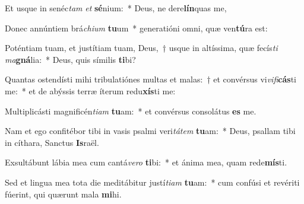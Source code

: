 \item Et usque in senéc\textit{tam} \textit{et} \textbf{sé}nium:~* Deus, ne dere\textbf{lín}quas me,
\item Donec annúntiem brá\textit{chi}\textit{um} \textbf{tu}um~* generatióni omni, quæ ven\textbf{tú}ra est:
\item Poténtiam tuam, et justítiam tuam, Deus,~† usque in altíssima, quæ fecís\textit{ti} \textit{ma}\textbf{gná}lia:~* Deus, quis símilis \textbf{ti}bi?
\item Quantas ostendísti mihi tribulatiónes multas et malas:~† et convérsus vi\textit{vi}\textit{fi}\textbf{cás}ti me:~* et de abýssis terræ íterum redu\textbf{xís}ti me:
\item Multiplicásti magnificén\textit{ti}\textit{am} \textbf{tu}am:~* et convérsus consolátus \textbf{es} me.
\item Nam et ego confitébor tibi in vasis psalmi veri\textit{tá}\textit{tem} \textbf{tu}am:~* Deus, psallam tibi in cíthara, Sanctus \textbf{Is}raël.
\item Exsultábunt lábia mea cum cantá\textit{ve}\textit{ro} \textbf{ti}bi:~* et ánima mea, quam rede\textbf{mís}ti.
\item Sed et lingua mea tota die meditábitur justí\textit{ti}\textit{am} \textbf{tu}am:~* cum confúsi et revériti fúerint, qui quærunt mala \textbf{mi}hi.
